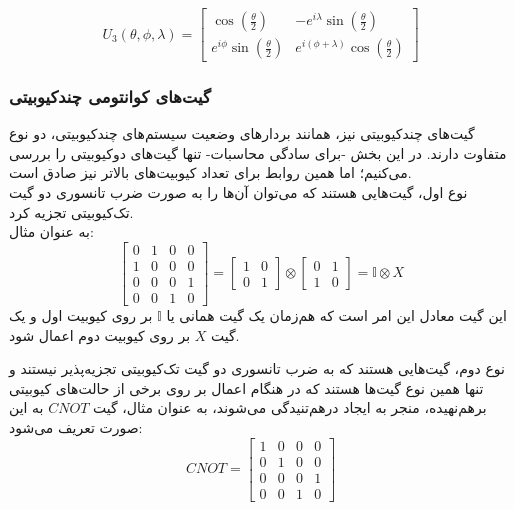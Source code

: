 \begin{equation}
U_3(\theta, \phi, \lambda) = \begin{bmatrix} \cos(\frac{\theta}{2}) & -e^{i\lambda}\sin(\frac{\theta}{2}) \\[6pt]
            e^{i\phi}\sin(\frac{\theta}{2}) & e^{i(\phi+\lambda)}\cos(\frac{\theta}{2})
     \end{bmatrix}
\end{equation}

\subsubsection{
    گیت‌های کوانتومی چند‌کیوبیتی
}
گیت‌های چندکیوبیتی نیز، همانند بردارهای وضعیت سیستم‌های چندکیوبیتی، دو نوع متفاوت دارند. در این بخش -برای سادگی محاسبات- تنها گیت‌های دوکیوبیتی را بررسی می‌کنیم؛ اما همین روابط برای تعداد کیوبیت‌های بالاتر نیز صادق است. \\
نوع اول، گیت‌هایی هستند که می‌توان آن‌ها را به صورت ضرب تانسوری دو گیت تک‌کیوبیتی تجزیه کرد.
\\
به عنوان مثال:
\begin{equation}
    \begin{bmatrix}
    0 & 1 & 0 & 0 \\[3pt]
    1 & 0 & 0 & 0 \\[3pt]
    0 & 0 & 0 & 1 \\[3pt]
    0 & 0 & 1 & 0 
    \end{bmatrix} =
    \begin{bmatrix}
    1 & 0 \\[3pt]
    0 & 1 
    \end{bmatrix} \otimes
    \begin{bmatrix}
    0 & 1 \\[3pt]
    1 & 0
    \end{bmatrix}
    = \mathbb{I} \otimes X
\end{equation}
این گیت معادل این امر است که هم‌زمان یک گیت همانی یا
$\mathbb{I}$
بر روی کیوبیت اول و یک گیت
$X$
بر روی کیوبیت دوم اعمال شود.

نوع دوم، گیت‌هایی هستند که به ضرب تانسوری دو گیت تک‌کیوبیتی تجزیه‌پذیر نیستند و تنها همین نوع گیت‌ها هستند که در هنگام اعمال بر روی برخی از حالت‌های کیوبیتی برهم‌نهیده، منجر به ایجاد درهم‌تنیدگی می‌شوند، به عنوان مثال، گیت
$CNOT$
به این صورت تعریف می‌شود:
\begin{equation}
    CNOT = \begin{bmatrix}
    1 & 0 & 0 & 0 \\[3pt]
    0 & 1 & 0 & 0 \\[3pt]
    0 & 0 & 0 & 1 \\[3pt]
    0 & 0 & 1 & 0 
    \end{bmatrix}
\end{equation}

